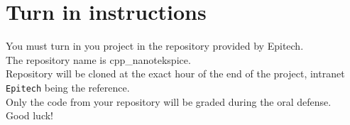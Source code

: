 \documentclass{koala-en}
\begin{document}
\chapter{Turn in instructions}

    You must turn in you project in the repository provided by
  Epitech.\\
    The repository name is cpp\_nanotekspice.\\

    Repository will be cloned at the exact hour of the end of the project, 
    intranet \texttt{Epitech} being the reference.\\

   Only the code from your repository will be graded during the oral defense.\\

   Good luck!


\end{document}

